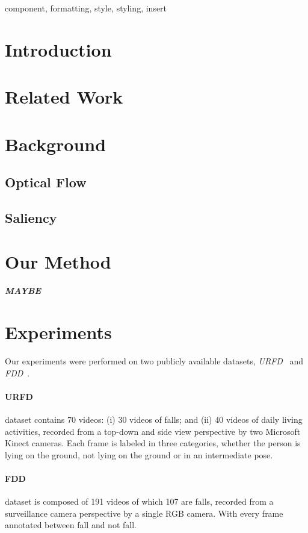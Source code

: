 \documentclass[conference]{IEEEtran}
\begin{document}
\begin{IEEEkeywords}
component, formatting, style, styling, insert
\end{IEEEkeywords}

\section{Introduction}

\section{Related Work}

\section{Background}

\subsection{Optical Flow}

\subsection{Saliency}

\section{Our Method}

\color{red}
\centering
\textbf{\textit{MAYBE}}
\color{black}

\section{Experiments}

Our experiments were performed on two publicly available datasets, \textit{URFD}~\cite{kepski2014human} and \textit{FDD}~\cite{charfi2013optimised}.

\paragraph{URFD} dataset contains 70 videos: (i) 30 videos of falls; and (ii) 40 videos of daily living activities, recorded from a top-down and side view perspective by two Microsoft Kinect cameras. Each frame is labeled in three categories, whether the person is lying on the ground, not lying on the ground or in an intermediate pose.
\paragraph{FDD} dataset is composed of 191 videos of which 107 are falls, recorded from a surveillance camera perspective by a single RGB camera. With every frame annotated between fall and not fall.
\end{document}
